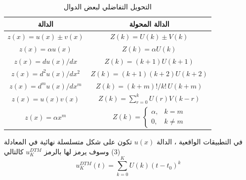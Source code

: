 \begin{table}[h!]
	\centering
	\renewcommand{\arraystretch}{2.5}
	\begin{tabular}{|c|c|}
		\hline
		\textbf{الدالة} & \textbf{الدالة المحولة}\\
		\hline
		$z(x) = u(x) \pm v(x)$ & $Z(k) = U(k) \pm V(k)$\\
		\hline
		$z(x) = \alpha u(x)$ & $Z(k) = \alpha U(k)$\\
		\hline
		$z(x) = du(x)/dx$ & $Z(k) = (k+1)U(k+1)$\\
		\hline
		$z(x) = d^2 u(x)/dx^2$ & $Z(k) = (k+1)(k+2)U(k+2)$\\
		\hline
		$z(x) = d^m u(x)/dx^m$ & $Z(k) = (k+m)!/k! \, U(k+m)$\\
		\hline
		$z(x) = u(x)v(x)$ & $Z(k) = \displaystyle \sum_{r=0}^{k} U(r)V(k-r)$\\
		\hline
		$z(x) = \alpha x^m$ & $Z(k) = 
		\begin{cases}
			\alpha, & k = m \\
			0, & k \neq m
		\end{cases}$\\
		\hline
	\end{tabular}
	\caption{التحويل التفاضلي لبعض الدوال}
\end{table}
\noindent في التطبيقات الواقعية ، الدالة $u(x)$ تكون على شكل متسلسلة نهائية في المعادلة (3) وسوف يرمز لها بالرمز 
$u_K^{DTM}$ كالتالي
\begin{equation}
	u_K^{DTM}(t) = \sum_{k=0}^{K} U(k) (t - t_0)^k
\end{equation}


\newpage
